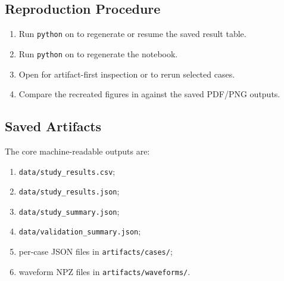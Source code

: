 \documentclass[aps,pra,twocolumn,reprint,floatfix,amsmath,amssymb]{revtex4-2}
\begin{document}
\subsection{Reproduction Procedure}
\begin{enumerate}
\item Run \texttt{python} on  to regenerate or resume the saved result table.
\item Run \texttt{python} on  to regenerate the notebook.
\item Open  for artifact-first inspection or to rerun selected cases.
\item Compare the recreated figures in  against the saved PDF/PNG outputs.
\end{enumerate}

\subsection{Saved Artifacts}
The core machine-readable outputs are:
\begin{enumerate}
\item \texttt{data/study\_results.csv};
\item \texttt{data/study\_results.json};
\item \texttt{data/study\_summary.json};
\item \texttt{data/validation\_summary.json};
\item per-case JSON files in \texttt{artifacts/cases/};
\item waveform NPZ files in \texttt{artifacts/waveforms/}.
\end{enumerate}
\end{document}
